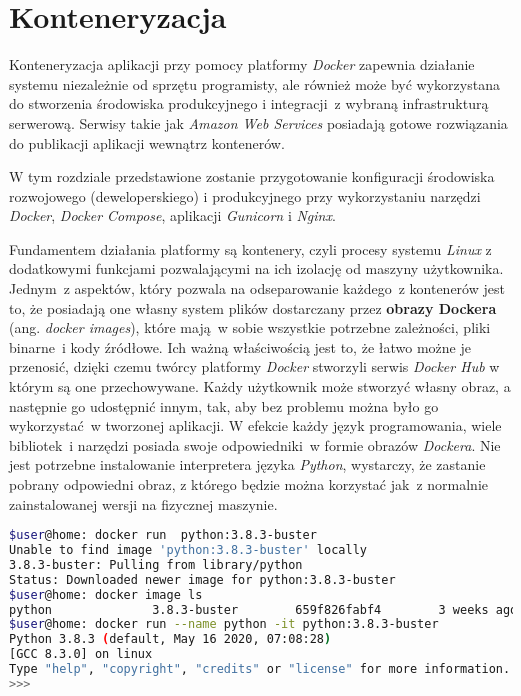 \chapter{Konteneryzacja}
\label{roz6}
Konteneryzacja aplikacji przy pomocy platformy \textit{Docker} zapewnia działanie systemu niezależnie od sprzętu programisty\cite{Ziade:2018}, ale również może być wykorzystana do stworzenia środowiska produkcyjnego\cite{Ziade:2018} i integracji~z wybraną infrastrukturą serwerową. Serwisy takie jak \textit{Amazon Web Services} posiadają gotowe rozwiązania do publikacji aplikacji wewnątrz kontenerów\cite{aws}.

 W tym rozdziale przedstawione zostanie przygotowanie konfiguracji środowiska rozwojowego (deweloperskiego) i produkcyjnego przy wykorzystaniu narzędzi \textit{Docker}, \textit{Docker Compose}, aplikacji \textit{Gunicorn} i \textit{Nginx}\cite{Herman:2020}.
 
 Fundamentem działania platformy są kontenery, czyli procesy systemu \textit{Linux} z dodatkowymi funkcjami pozwalającymi na ich izolację od maszyny użytkownika. Jednym~z aspektów, który pozwala na odseparowanie każdego~z kontenerów jest to, że posiadają one własny system plików dostarczany przez \textbf{obrazy Dockera} (ang. \textit{docker images}), które mają~w sobie wszystkie potrzebne zależności, pliki binarne~i kody źródłowe\cite{docker}. Ich ważną właściwością jest to, że łatwo możne je przenosić, dzięki czemu twórcy platformy \textit{Docker} stworzyli serwis \textit{Docker Hub} w którym są one przechowywane\cite{docker}. Każdy użytkownik może stworzyć własny obraz, a następnie go udostępnić innym, tak, aby bez problemu można było go wykorzystać~w tworzonej aplikacji. W efekcie każdy język programowania, wiele bibliotek~i narzędzi posiada swoje odpowiedniki~w formie obrazów \textit{Dockera}. Nie jest potrzebne instalowanie interpretera języka \textit{Python}, wystarczy, że zastanie pobrany odpowiedni obraz, z którego będzie można korzystać jak~z normalnie zainstalowanej wersji na fizycznej maszynie.
 
\begin{lstlisting}[language=Bash, caption={Proces pobrania i wykorzystanie przykładowego obrazu \textit{Dockera}.}, label={code:docker}]
$user@home: docker run  python:3.8.3-buster
Unable to find image 'python:3.8.3-buster' locally
3.8.3-buster: Pulling from library/python
Status: Downloaded newer image for python:3.8.3-buster
$user@home: docker image ls
python              3.8.3-buster        659f826fabf4        3 weeks ago         934MB
$user@home: docker run --name python -it python:3.8.3-buster
Python 3.8.3 (default, May 16 2020, 07:08:28)
[GCC 8.3.0] on linux
Type "help", "copyright", "credits" or "license" for more information.
>>>
\end{lstlisting}

